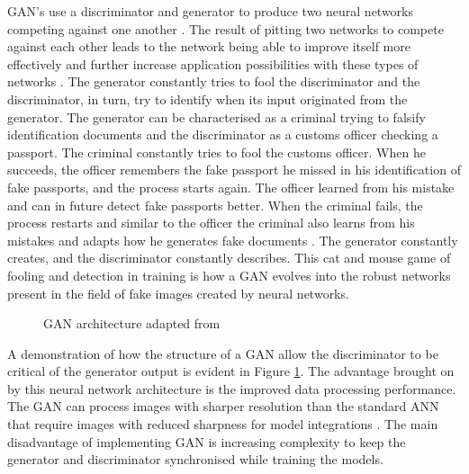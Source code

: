 GAN's use a discriminator and generator to produce two neural networks competing against one another \citep{Creswell2018}. The result of pitting two networks to compete against each other leads to the network being able to improve itself more effectively and further increase application possibilities with these types of networks \citep{Goodfellow2014}. The generator constantly tries to fool the discriminator and the discriminator, in turn, try to identify when its input originated from the generator. 
The generator can be characterised as a criminal trying to falsify identification documents and the discriminator as a customs officer checking a passport. The criminal constantly tries to fool the customs officer. When he succeeds, the officer remembers the fake passport he missed in his identification of fake passports, and the process starts again. The officer learned from his mistake and can in future detect fake passports better. When the criminal fails, the process restarts and similar to the officer the criminal also learns from his mistakes and adapts how he generates fake documents \citep{Goodfellow2014}. The generator constantly creates, and the discriminator constantly describes. This cat and mouse game of fooling and detection in training is how a GAN evolves into the robust networks present in the field of fake images created by neural networks.

\begin{figure}[H]%
\centering
{}%
\caption{GAN architecture adapted from \cite{Creswell2018}}%
\label{fig:6}%
\end{figure}

A demonstration of how the structure of a GAN allow the discriminator to be critical of the generator output is evident in Figure \ref{fig:6}. The advantage brought on by this neural network architecture is the improved data processing performance. The GAN can process images with sharper resolution than the standard ANN that require images with reduced sharpness for model integrations \citep{Goodfellow2014}. The main disadvantage of implementing GAN is increasing complexity to keep the generator and discriminator synchronised while training the models. 

